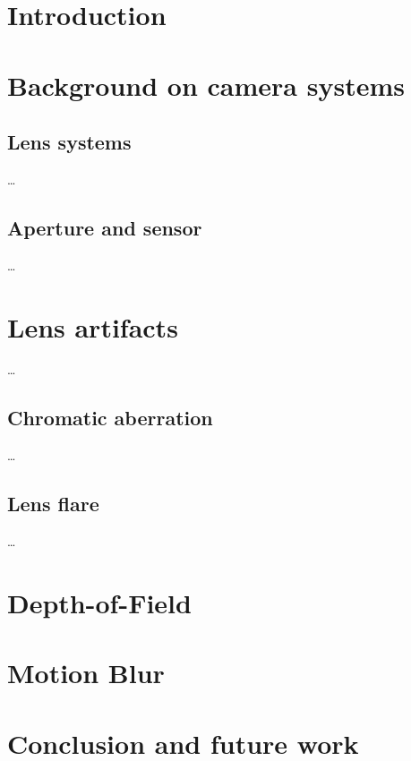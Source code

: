 
\chapter{Introduction}
\label{ch:Introduction}


\chapter{Background on camera systems}
\label{ch:Content1}


\section{Lens systems}

\dots

\section{Aperture and sensor}

\dots


\chapter{Lens artifacts}
\label{ch:Content2}
\dots
\section{Chromatic aberration}
\label{ch:Content2:sec:Section1}

\dots

\section{Lens flare}
\label{ch:Content2:sec:Section2}

\dots

\chapter{Depth-of-Field}

\chapter{Motion Blur}

\chapter{Conclusion and future work}